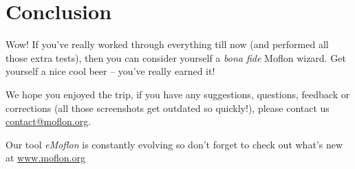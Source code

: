 \chapter{Conclusion} 

Wow!  If you've really worked through everything till now (and performed all those extra tests), then you can consider yourself a \emph{bona fide} Moflon wizard.
Get yourself a nice cool beer -- you've really earned it!

We hope you enjoyed the trip, if you have any suggestions, questions, feedback or corrections (all those screenshots get outdated so quickly!), please contact us \url{contact@moflon.org}.

Our tool \emph{eMoflon} is constantly evolving so don't forget to check out what's new at \url{www.moflon.org}
 